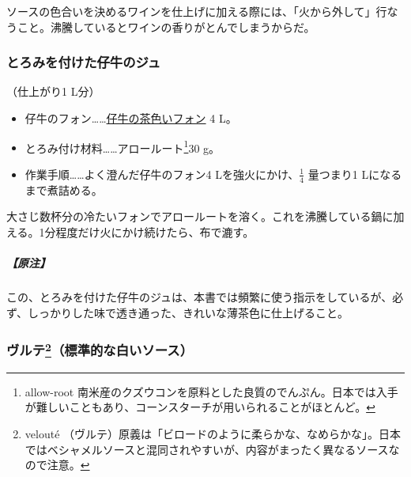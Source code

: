 \begin{recette}
ソースの色合いを決めるワインを仕上げに加える際には、「火から外して」行なうこと。沸騰しているとワインの香りがとんでしまうからだ。

\atoaki{}

\hypertarget{jus-de-veau-lie}{%
\subsubsection{とろみを付けた仔牛のジュ}\label{jus-de-veau-lie}}



（仕上がり1 L分）

\begin{itemize}
\item
  仔牛のフォン\ldots{}\ldots{}\protect\hyperlink{jus-de-veau-brun}{仔牛の茶色いフォン}
  4 L。
\item
  とろみ付け材料\ldots{}\ldots{}アロールート\footnote{allow-root
    南米産のクズウコンを原料とした良質のでんぷん。日本では入手が難しいこともあり、コーンスターチが用いられることがほとんど。}30
  g。
\item
  作業手順\ldots{}\ldots{}よく澄んだ仔牛のフォン4
  Lを強火にかけ、\(\frac{1}{4}\) 量つまり1 Lになるまで煮詰める。
\end{itemize}

大さじ数杯分の冷たいフォンでアロールートを溶く。これを沸騰している鍋に加える。1分程度だけ火にかけ続けたら、布で漉す。

\hypertarget{nota-jus-de-veau-lie}{%
\subparagraph{【原注】}\label{nota-jus-de-veau-lie}}

この、とろみを付けた仔牛のジュは、本書では頻繁に使う指示をしているが、必ず、しっかりした味で透き通った、きれいな薄茶色に仕上げること。

\atoaki{}

\hypertarget{veloute}{%
\subsubsection[ヴルテ（標準的な白いソース）]{\texorpdfstring{ヴルテ\footnote{velouté
  （ヴルテ）原義は「ビロードのように柔らかな、なめらかな」。日本ではベシャメルソースと混同されやすいが、内容がまったく異なるソースなので注意。}（標準的な白いソース）}{ヴルテ（標準的な白いソース）}}\label{veloute}}


\end{recette}
